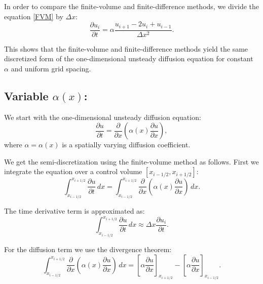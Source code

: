 \documentclass{article}
\begin{document}
In order to compare the finite-volume and finite-difference methods, we divide the equation \eqref{FVM} by $\Delta x$:
\begin{equation}
  \frac{\partial u_i}{\partial t} = \alpha \frac{u_{i+1} - 2u_i + u_{i-1}}{\Delta x^2}.
\end{equation}

This shows that the finite-volume and finite-difference methods yield the same discretized form of the one-dimensional unsteady diffusion equation for constant $\alpha$ and uniform grid spacing.

\subsection{Variable $\alpha (x)$:}
We start with the one-dimensional unsteady diffusion equation:
\begin{equation}
\frac{\partial u}{\partial t} = \frac{\partial}{\partial x} \left( \alpha(x) \frac{\partial u}{\partial x} \right),
\end{equation}
where \(\alpha = \alpha(x)\) is a spatially varying diffusion coefficient.

We get the semi-discretization using the finite-volume method as follows.
First we integrate the equation over a control volume \( [x_{i-1/2}, x_{i+1/2}] \):
\begin{equation}
\int_{x_{i-1/2}}^{x_{i+1/2}} \frac{\partial u}{\partial t} \, dx = \int_{x_{i-1/2}}^{x_{i+1/2}} \frac{\partial}{\partial x} \left( \alpha(x) \frac{\partial u}{\partial x} \right) \, dx.
\end{equation}

The time derivative term is approximated as:
\begin{equation}
  \int_{x_{i-1/2}}^{x_{i+1/2}} \frac{\partial u}{\partial t} \, dx \approx \Delta x \frac{\partial u_i}{\partial t}.
  \end{equation}

For the diffusion term we use the divergence theorem:
\begin{equation}
  \int_{x_{i-1/2}}^{x_{i+1/2}} \frac{\partial}{\partial x} \left( \alpha(x) \frac{\partial u}{\partial x} \right) \, dx = \left[ \alpha \frac{\partial u}{\partial x} \right]_{x_{i+1/2}} - \left[ \alpha \frac{\partial u}{\partial x} \right]_{x_{i-1/2}}.
  \end{equation}
\end{document}
